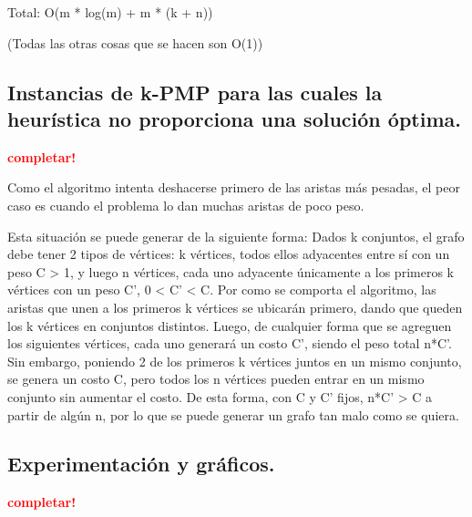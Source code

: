 Total: O(m * log(m) + m * (k + n))

(Todas las otras cosas que se hacen son O(1))



\newpage
\subsection{Instancias de k-PMP para las cuales la heurística no proporciona
            una solución óptima.}
\vspace*{0.3cm}
\textcolor{red}{\textbf{completar!}}

Como el algoritmo intenta deshacerse primero de las aristas más pesadas, el
peor caso es cuando el problema lo dan muchas aristas de poco peso.

Esta situación se puede generar de la siguiente forma: Dados k conjuntos, el
grafo debe tener 2 tipos de vértices: k vértices, todos ellos adyacentes entre
sí con un peso C > 1, y luego n vértices, cada uno adyacente únicamente a los
primeros k vértices con un peso C', 0 < C' < C.  Por como se comporta el
algoritmo, las aristas que unen a los primeros k vértices se ubicarán primero,
dando que queden los k vértices en conjuntos distintos.  Luego, de cualquier
forma que se agreguen los siguientes vértices, cada uno generará un costo  C',
siendo el peso total n*C'.  Sin embargo, poniendo 2 de los primeros k vértices
juntos en un mismo conjunto, se genera un costo C, pero todos los n vértices
pueden entrar en un mismo conjunto sin aumentar el costo.  De esta forma, con C
y C' fijos, n*C' > C a partir de algún n, por lo que se puede generar un grafo
tan malo como se quiera.


\newpage \subsection{Experimentación y gráficos.}
\vspace*{0.3cm}

\textcolor{red}{\textbf{completar!}}
